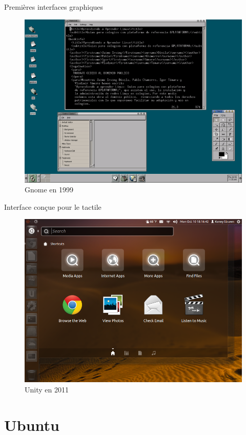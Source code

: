 \documentclass{beamer}
\begin{document}
\begin{frame}
  \center Premi\`eres interfaces graphiques
  \begin{figure}
    \includegraphics[width=0.8\linewidth]{images/GNOME-1999}
    \caption{Gnome en 1999}
  \end{figure}
\end{frame}

\begin{frame}
  \center Interface con\c{c}ue pour le tactile
  \begin{figure}
    \includegraphics[width=0.8\linewidth]{images/Unity-2011}
    \caption{Unity en 2011}
  \end{figure}
\end{frame}

\section{Ubuntu}
\end{document}
